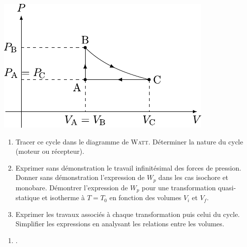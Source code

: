 \documentclass[a4paper, 10pt, final, garamond]{book}
\begin{document}
\begin{enumerate}[label=\sqenumi]
\begin{isd}[righthand ratio=.30, interior hidden]
\begin{center}
{				\includegraphics[width=\linewidth, valign=t]{cycle_lenoir}
			}
		\end{center}
		\vspace{-30pt}
	\end{isd}
	\begin{enumerate}[label=\sqenumi]
		\item Tracer ce cycle dans le diagramme de \textsc{Watt}. Déterminer la
		      nature du cycle (moteur ou récepteur).
		\item Exprimer sans démonstration le travail infinitésimal des forces de
		      pression. Donner sans démonstration l'expression de $W_p$ dans les cas
		      isochore et monobare. Démontrer l'expression de $W_p$ pour une
		      transformation quasi-statique et isotherme à $T = T_0$ en fonction des
		      volumes $V_i$ et $V_f$.
		\item Exprimer les travaux associés à chaque transformation puis celui du
		      cycle. Simplifier les expressions en analysant les relations entre
		      les volumes.
	\end{enumerate}
	\smallbreak
	\begin{enumerate}[label=\sqenumi]
		\item {}. 

\end{enumerate}
\end{enumerate}
\end{document}
